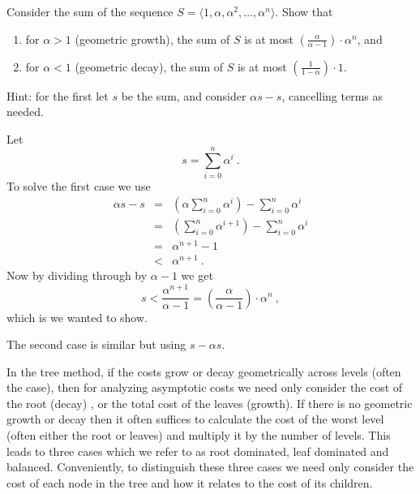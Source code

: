 \begin{flex}
\begin{exercise}
  Consider the sum of the sequence $S = \langle 1, \alpha, \alpha^2,
  \ldots, \alpha^n \rangle$.   Show that
\begin{enumerate}
\item
 for $\alpha > 1$ (geometric growth), the sum of $S$ is at most
  $\left(\frac{\alpha}{\alpha -1}\right) \cdot \alpha^n$, and 
\item
for $\alpha < 1$ (geometric decay), the
  sum of $S$ is at most  $\left(\frac{1}{1 - \alpha}\right) \cdot 1$.
\end{enumerate}
Hint: for the first let $s$ be the sum, and consider $\alpha s - s$, cancelling
terms as needed.
\end{exercise}

\begin{solution}
Let
\[s = \sum_{i=0}^n \alpha^i~.\]
To solve the first case we use
\[ 
\begin{array}{lcl}
\alpha s - s & = & \left(\alpha \sum_{i=0}^n \alpha^i\right) -
                   \sum_{i=0}^n \alpha^i\\
                  & = & \left(\sum_{i=0}^n \alpha^{i+1}\right) -
                        \sum_{i=0}^n \alpha^i\\
                  & = & \alpha^{n+1} - 1\\
                  & < & \alpha^{n+1} ~.
\end{array}
\]
Now by dividing through by $\alpha - 1$ we get
\[ s < \frac{\alpha^{n+1}}{\alpha-1} = \left(\frac{\alpha}{\alpha-1}\right)
  \cdot \alpha^n~, \]
which is we wanted to show.

The second case is similar but using $s - \alpha s$.
\end{solution}
\end{flex}

\begin{gram}
  In the tree method, if the costs grow or decay geometrically across
  levels (often the case), then for analyzing asymptotic costs we need only consider the
  cost of the root (decay) , or the total cost of the leaves (growth).
%
  If there is no geometric growth or decay then it often suffices to
  calculate the cost of the worst level (often either the root or
  leaves) and multiply it by the number of levels.
%
  This leads to three cases which we refer to as root dominated, leaf 
  dominated and balanced.   
%  
  Conveniently, to distinguish these three cases 
  we need only consider the cost of each node in the 
  tree and how it relates to the cost of its children.
\end{gram}


